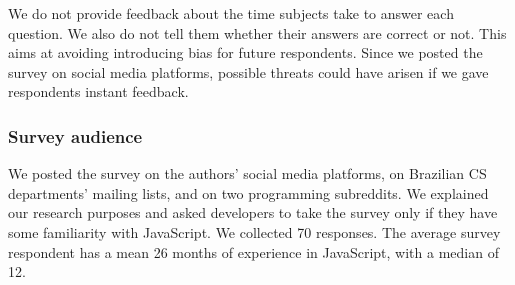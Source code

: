 We do not provide feedback about the time subjects take to answer each question. We also do not tell them whether their answers are correct or not. This aims at avoiding introducing bias for future respondents. Since we posted the survey on social media platforms, possible threats could have arisen if we gave respondents instant feedback.


\subsubsection*{Survey audience}

We posted the survey on the authors' social media platforms, on Brazilian CS departments' mailing lists, and on two programming subreddits. We explained our research purposes and asked developers to take the survey only if they have some familiarity with JavaScript. We collected 70 responses. The average survey respondent has a mean 26 months of experience in JavaScript, with a median of 12. 
